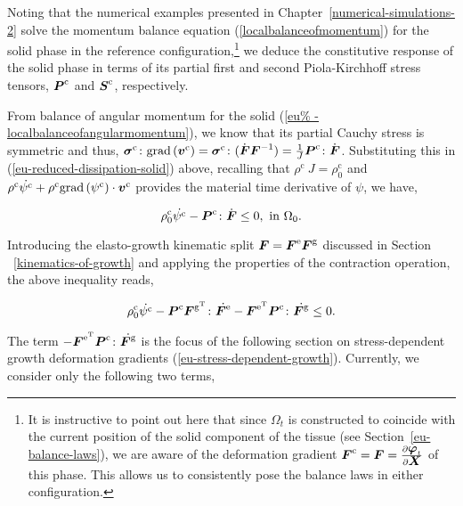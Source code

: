 Noting that the numerical examples presented in
Chapter~\ref{numerical-simulations-2} solve the momentum balance
equation (\ref{localbalanceofmomentum}) for the solid phase in the
reference configuration,\footnote{It is instructive to point out here
  that since $\Omega_{t}$ is constructed to coincide with the current
  position of the solid component of the tissue (see
  Section~\ref{eu-balance-laws}), we are aware of the deformation
  gradient $\mbox{\boldmath$ F$}^{\mathrm{c}}=\mbox{\boldmath$ F$}=\frac{\partial \mbox{\boldmath$\varphi$}_{t}}{\partial
    \mbox{\boldmath$ X$}}$ of this phase. This allows us to consistently pose the
  balance laws in either configuration.} we deduce the constitutive
response of the solid phase in terms of its partial first and second
Piola-Kirchhoff stress tensors, $\mbox{\boldmath$ P$}^{\mathrm{c}}$ and
$\mbox{\boldmath$ S$}^{\mathrm{c}}$, respectively.

From balance of angular momentum for the solid (\ref{eu%
  -localbalanceofangularmomentum}), we know that its partial Cauchy
stress is symmetric and thus, $\mbox{\boldmath$\sigma$}^{\mathrm{c}} \colon
\mathrm{grad} \left(\mbox{\boldmath$ v$}^{\mathrm{c}}\right) =\mbox{\boldmath$\sigma$}^{\mathrm{c}}
\colon (\dot{\mbox{\boldmath$ F$}}\mbox{\boldmath$ F$}^{-1}) =\frac{1}{J} \mbox{\boldmath$ P$}^{\mathrm{c}} \colon
\dot{\mbox{\boldmath$ F$}}$. Substituting this in (\ref{eu-reduced-dissipation-solid})
above, recalling that \mbox{$\rho^{\mathrm{c}}\ J =
  \rho_0^{\mathrm{c}}$} and $\rho^{\mathrm{c}}
\dot{\psi^{\mathrm{c}}}+ \rho^{\mathrm{c}}
\mathrm{grad}\left(\psi^{\mathrm{c}}\right) \cdot\mbox{\boldmath$ v$}^{\mathrm{c}}$
provides the material time derivative of $\psi$, we have,

\begin{equation*}
\rho_{0}^{\mathrm{c}} \dot{\psi^{\mathrm{c}}}
-\bP^{\mathrm{c}}\colon\dot{\bF}\leq 0,\ \mathrm{in}\ \Omega_{0}.
\end{equation*}

\noindent Introducing the elasto-growth kinematic split
$\mbox{\boldmath$ F$}=\mbox{\boldmath$ F$}^{\mathrm{e}}\mbox{\boldmath$ F$}^{\mathrm{g}}$ discussed in Section%
~\ref{kinematics-of-growth} and applying the properties of the
contraction operation, the above inequality reads,

\begin{equation*}
\rho_{0}^{\mathrm{c}} \dot{\psi^{\mathrm{c}}} - \mbox{\boldmath$ P$}^{\mathrm{c}}
\mbox{\boldmath$ F$}^{\mathrm{g}^{\mathrm{T}}} \colon \dot{\mbox{\boldmath$ F$}^{\mathrm{e}}} -
\mbox{\boldmath$ F$}^{\mathrm{e}^{\mathrm{T}}} \mbox{\boldmath$ P$}^{\mathrm{c}} \colon
\dot{\mbox{\boldmath$ F$}^{\mathrm{g}}} \leq 0.
\end{equation*}

\noindent The term $-\mbox{\boldmath$ F$}^{\mathrm{e}^{\mathrm{T}}} \mbox{\boldmath$ P$}^{\mathrm{c}}
\colon \dot{\mbox{\boldmath$ F$}^{\mathrm{g}}}$ is the focus of the following section
on stress-dependent growth deformation gradients
(\ref{eu-stress-dependent-growth}). Currently, we consider only the
following two terms,

